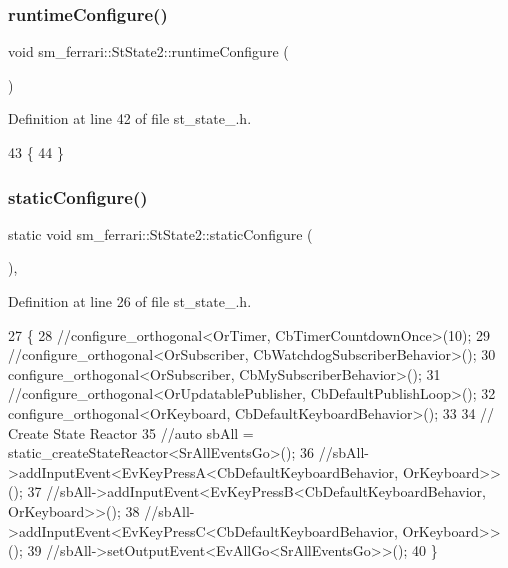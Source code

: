 \subsubsection{\texorpdfstring{runtime\+Configure()}{runtimeConfigure()}}
{\footnotesize\ttfamily void sm\+\_\+ferrari\+::\+St\+State2\+::runtime\+Configure (\begin{DoxyParamCaption}{ }\end{DoxyParamCaption})\hspace{0.3cm}{\ttfamily [inline]}}



Definition at line 42 of file st\+\_\+state\+\_.\+h.


\begin{DoxyCode}
43     \{
44     \}
\end{DoxyCode}
\mbox{\label{structsm__ferrari_1_1StState2_a7767abca55071ed12ae3334b0a720c7c}} 
\subsubsection{\texorpdfstring{static\+Configure()}{staticConfigure()}}
{\footnotesize\ttfamily static void sm\+\_\+ferrari\+::\+St\+State2\+::static\+Configure (\begin{DoxyParamCaption}{ }\end{DoxyParamCaption})\hspace{0.3cm}{\ttfamily [inline]}, {\ttfamily [static]}}



Definition at line 26 of file st\+\_\+state\+\_.\+h.


\begin{DoxyCode}
27     \{
28         \textcolor{comment}{//configure\_orthogonal<OrTimer, CbTimerCountdownOnce>(10);}
29         \textcolor{comment}{//configure\_orthogonal<OrSubscriber, CbWatchdogSubscriberBehavior>();}
30         configure\_orthogonal<OrSubscriber, CbMySubscriberBehavior>();
31         \textcolor{comment}{//configure\_orthogonal<OrUpdatablePublisher, CbDefaultPublishLoop>();}
32         configure\_orthogonal<OrKeyboard, CbDefaultKeyboardBehavior>();
33 
34         \textcolor{comment}{// Create State Reactor}
35         \textcolor{comment}{//auto sbAll = static\_createStateReactor<SrAllEventsGo>();}
36         \textcolor{comment}{//sbAll->addInputEvent<EvKeyPressA<CbDefaultKeyboardBehavior, OrKeyboard>>();}
37         \textcolor{comment}{//sbAll->addInputEvent<EvKeyPressB<CbDefaultKeyboardBehavior, OrKeyboard>>();}
38         \textcolor{comment}{//sbAll->addInputEvent<EvKeyPressC<CbDefaultKeyboardBehavior, OrKeyboard>>();}
39         \textcolor{comment}{//sbAll->setOutputEvent<EvAllGo<SrAllEventsGo>>();}
40     \}
\end{DoxyCode}


